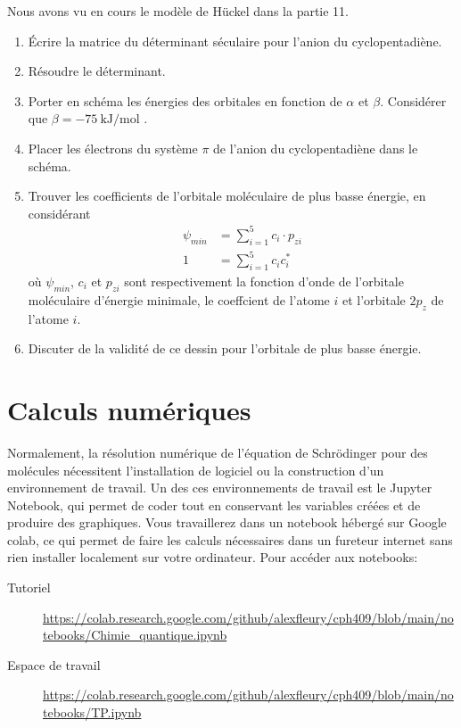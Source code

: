 \documentclass[12pt,letterpaper]{article}
\begin{document}
Nous avons vu en cours le modèle de Hückel dans la partie 11.
\begin{enumerate}[resume]
\item Écrire la matrice du déterminant séculaire pour l'anion du cyclopentadiène.
\item Résoudre le déterminant.
\item Porter en schéma les énergies des orbitales en fonction de $\alpha$ et $\beta$. Considérer que $\beta=\SI{-75}{\kilo\joule\per\mole}$ \cite{mcquarrie}.
\item Placer les électrons du système $\pi$ de l'anion du cyclopentadiène dans le schéma.
\item Trouver les coefficients de l'orbitale moléculaire de plus basse énergie, en considérant
\begin{align}
\psi_{min} &= \sum^{5}_{i=1} c_i \cdot p_{zi} \\
1 &= \sum^{5}_{i=1} c_i c_i^*
\end{align}
où $\psi_{min}$, $c_i$ et $p_{zi}$ sont respectivement la fonction d'onde de l'orbitale moléculaire d'énergie minimale, le coeffcient de l'atome $i$ et l'orbitale $2p_z$ de l'atome $i$. 
\item Discuter de la validité de ce dessin pour l'orbitale de plus basse énergie.
\begin{center}
\end{center}
\end{enumerate}

\section*{Calculs numériques}

Normalement, la résolution numérique de l'équation de Schrödinger pour des molécules nécessitent l'installation de logiciel ou la construction d'un environnement de travail. Un des ces environnements de travail est le Jupyter Notebook, qui permet de coder tout en conservant les variables créées et de produire des graphiques. Vous travaillerez dans un notebook hébergé sur Google colab, ce qui permet de faire les calculs nécessaires dans un fureteur internet sans rien installer localement sur votre ordinateur. Pour accéder aux notebooks:

\begin{description}
\item[Tutoriel] \url{https://colab.research.google.com/github/alexfleury/cph409/blob/main/notebooks/Chimie_quantique.ipynb}
\item[Espace de travail] \url{https://colab.research.google.com/github/alexfleury/cph409/blob/main/notebooks/TP.ipynb}
\end{description}
\end{document}
